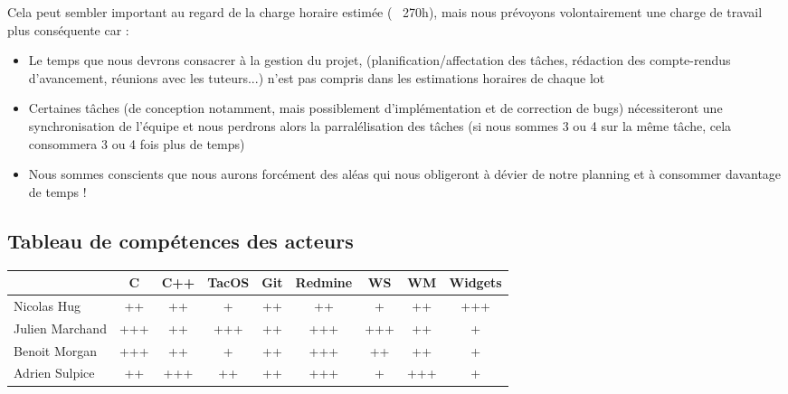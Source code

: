 Cela peut sembler important au regard de la charge horaire estimée (~ 270h), mais nous prévoyons volontairement une charge de travail plus conséquente car :
\begin{itemize}
\renewcommand{\labelitemi}{$\bullet$}
\item Le temps que nous devrons consacrer à la gestion du projet, (planification/affectation des tâches, rédaction des compte-rendus d'avancement, réunions avec les tuteurs...) n'est pas compris dans les estimations horaires de chaque lot
\item Certaines tâches (de conception notamment, mais possiblement d'implémentation et de correction de bugs) nécessiteront une synchronisation de l'équipe et nous perdrons alors la parralélisation des tâches (si nous sommes 3 ou 4 sur la même tâche, cela consommera 3 ou 4 fois plus de temps)
\item Nous sommes conscients que nous aurons forcément des aléas qui nous obligeront à dévier de notre planning et à consommer davantage de temps ! 
\end{itemize}

\subsection{Tableau de compétences des acteurs}
\begin{tabular}{|l|c|c|c|c|c|c|c|c|}
  \rowcolor{dark_grey} \hline &  C \footnotemark[1] & C++ \footnotemark[2] & TacOS & Git & Redmine & WS \footnotemark[3] & WM \footnotemark[4] & Widgets \footnotemark[5] \\
  \hline
  Nicolas Hug       &   ++    &   ++    &   +   &   ++    &   ++    &   +     &   ++    &   +++ \\
  \hline
  Julien Marchand   &   +++   &   ++    &  +++  &   ++    &   +++   &   +++   &   ++    &   + \\
  \hline
  Benoit Morgan     &   +++   &   ++    &   +   &   ++    &   +++   &   ++    &   ++    &   + \\
  \hline
  Adrien Sulpice    &   ++    &   +++   &   ++  &   ++    &   +++   &   +     &   +++   &   + \\
  \hline
\end{tabular}



